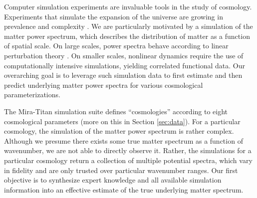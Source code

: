 \documentclass[11pt]{article}
\begin{document}
Computer simulation experiments are invaluable tools in the study of cosmology.
Experiments that simulate the expansion of the universe are growing
in prevalence and complexity \citep[e.g.,][]{lawrence2010coyote,derose2019aemulus,
nishimichi2019dark,angulo2021bacco,euclid2021euclid,moran2023mira}.  
We are particularly motivated by a simulation
of the matter power spectrum, which describes the distribution of matter as a 
function of spatial scale. 
On large scales, power spectra behave according to linear perturbation 
theory \citep{pietroni2008flowing, lesgourgues2009non}.  On smaller scales, nonlinear 
dynamics require the use of computationally intensive simulations, yielding
correlated functional data.
Our overarching goal is to leverage such simulation data to 
first estimate and then predict underlying matter power spectra for various 
cosmological parameterizations.

The Mira-Titan simulation suite \citep{moran2023mira}
defines ``cosmologies'' according to eight cosmological parameters (more on this
in Section \ref{sec:data}).  For a particular cosmology, the simulation of the matter power spectrum 
is rather complex.  Although we presume there exists some true matter spectrum as a function
of wavenumber, we are not able to directly observe it.  Rather, the simulations for a 
particular cosmology return a collection of multiple potential spectra, 
which vary in fidelity and are only trusted over particular wavenumber ranges.  
Our first objective is to synthesize expert knowledge and all available 
simulation information into an effective estimate of the true underlying
matter spectrum.
\end{document}
